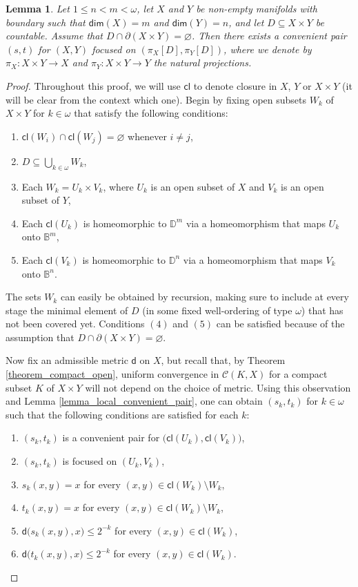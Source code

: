 \documentclass{amsart}
\theoremstyle{plain}
\newtheorem{lemma}[theorem]{Lemma}
\theoremstyle{definition}
\newcommand{\di}{\mathsf{d}}
\newcommand{\cl}{\mathsf{cl}}
\newcommand{\dime}{\mathsf{dim}}
\newcommand{\CC}{\mathcal{C}}
\newcommand{\BBB}{\mathbb{B}}
\newcommand{\DDD}{\mathbb{D}}
\begin{document}
\begin{lemma}\label{lemma_global_convenient_pair}
Let $1\leq n<m<\omega$, let $X$ and $Y$ be non-empty manifolds with boundary such that $\dime(X)=m$ and $\dime(Y)=n$, and let $D\subseteq X\times Y$ be countable. Assume that $D\cap\partial(X\times Y)=\varnothing$. Then there exists a convenient pair $(s,t)$ for $(X,Y)$ focused on $(\pi_X[D],\pi_Y[D])$, where we denote by $\pi_X:X\times Y\longrightarrow X$ and $\pi_Y:X\times Y\longrightarrow Y$ the natural projections.
\end{lemma}
\begin{proof}
Throughout this proof, we will use $\cl$ to denote closure in $X$, $Y$ or $X\times Y$ (it will be clear from the context which one). Begin by fixing open subsets $W_k$ of $X\times Y$ for $k\in\omega$ that satisfy the following conditions:
\begin{enumerate}
\item $\cl(W_i)\cap\cl(W_j)=\varnothing$ whenever $i\neq j$,
\item $D\subseteq\bigcup_{k\in\omega}W_k$,
\item Each $W_k=U_k\times V_k$, where $U_k$ is an open subset of $X$ and $V_k$ is an open subset of $Y$,
\item Each $\cl(U_k)$ is homeomorphic to $\DDD^m$ via a homeomorphism that maps $U_k$ onto $\BBB^m$,
\item Each $\cl(V_k)$ is homeomorphic to $\DDD^n$ via a homeomorphism that maps $V_k$ onto $\BBB^n$.
\end{enumerate}
The sets $W_k$ can easily be obtained by recursion, making sure to include at every stage the minimal element of $D$ (in some fixed well-ordering of type $\omega$) that has not been covered yet. Conditions $(4)$ and $(5)$ can be satisfied because of the assumption that $D\cap\partial(X\times Y)=\varnothing$.

Now fix an admissible metric $\di$ on $X$, but recall that, by Theorem \ref{theorem_compact_open}, uniform convergence in $\CC(K,X)$ for a compact subset $K$ of $X\times Y$ will not depend on the choice of metric. Using this observation and Lemma \ref{lemma_local_convenient_pair}, one can obtain $(s_k,t_k)$ for $k\in\omega$ such that the following conditions are satisfied for each $k$:
\begin{enumerate}
\item[(6)] $(s_k,t_k)$ is a convenient pair for $\big(\cl(U_k),\cl(V_k)\big)$,
\item[(7)] $(s_k,t_k)$ is focused on $(U_k,V_k)$,
\item[(8)] $s_k(x,y)=x$ for every $(x,y)\in\cl(W_k)\setminus W_k$,
\item[(9)] $t_k(x,y)=x$ for every $(x,y)\in\cl(W_k)\setminus W_k$,
\item[(10)] $\di\big(s_k(x,y),x\big)\leq 2^{-k}$ for every $(x,y)\in\cl(W_k)$,
\item[(11)] $\di\big(t_k(x,y),x\big)\leq 2^{-k}$ for every $(x,y)\in\cl(W_k)$.
\end{enumerate}


\end{proof}
\end{document}
